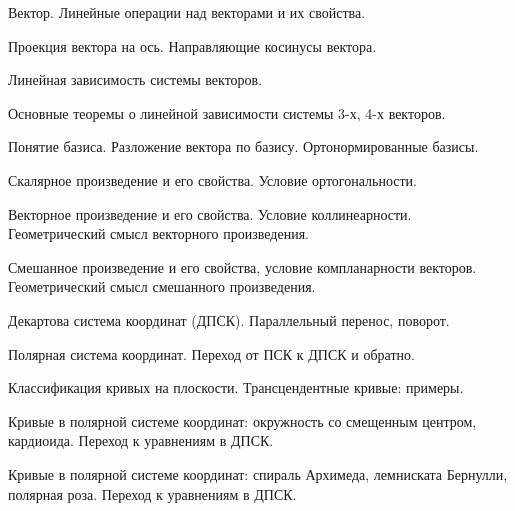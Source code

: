 \begin{question}
Вектор. Линейные операции над векторами и их свойства.
\end{question}
\begin{question}
Проекция вектора на ось. Направляющие косинусы вектора.
\end{question}
\begin{question}
Линейная зависимость системы векторов.
\end{question}
\begin{question}
Основные теоремы о линейной зависимости системы 3-х, 4-х векторов.
\end{question}
\begin{question}
Понятие базиса. Разложение вектора по базису. Ортонормированные
базисы.
\end{question}
\begin{question}
Скалярное произведение и его свойства. Условие ортогональности.
\end{question}
\begin{question}
Векторное произведение и его свойства. Условие коллинеарности.
Геометрический смысл векторного произведения.
\end{question}
\begin{question}
Смешанное произведение и его свойства, условие компланарности
векторов. Геометрический смысл смешанного произведения.
\end{question}
\begin{question}
Декартова система координат (ДПСК). Параллельный перенос, поворот.
\end{question}
\begin{question}
Полярная система координат. Переход от ПСК к ДПСК и обратно.
\end{question}
\begin{question}
Классификация кривых на плоскости. Трансцендентные кривые: примеры.
\end{question}
\begin{question}
Кривые в полярной системе координат: окружность со смещенным
центром, кардиоида. Переход к уравнениям в ДПСК.
\end{question}
\begin{question}
Кривые в полярной системе координат: спираль Архимеда, лемниската
Бернулли, полярная роза. Переход к уравнениям в ДПСК.
\end{question}

